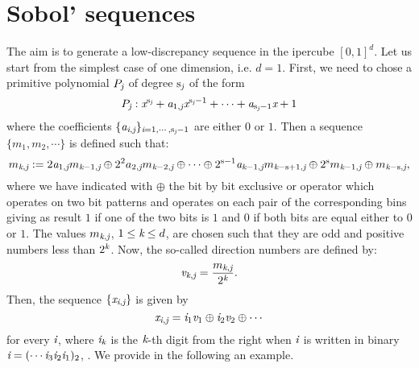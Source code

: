 \section{Sobol' sequences}
The aim is to generate a low-discrepancy sequence in the ipercube $[0,1]^{d}$. 
Let us start from the simplest case of one dimension, i.e. $d=1$. First, we need to chose a primitive polynomial $P_{\textit{j}}$ of degree $\textrm{s}_{\textit{j}}$ of the form
\begin{equation}
P_{\textit{j}}:\textit{x}^{\textrm{s}_{\textit{j}}}+\textit{a}_{1, \textit{j}}\textit{x}^{\textrm{s}_{\textit{j}}-1}+\cdots+\textit{a}_{\textrm{s}_{\textit{j}}-1}\textit{x}+1
\end{equation}
where the coefficients $\{\textit{a}_{\textit{i},\textit{j}}\}_{\textit{i}= 1, \cdots, \textrm{s}_{\textit{j}}-1}$ are either $0$ or $1$. 
Then a sequence $\{m_1,m_2,\cdots\}$ is defined such that:
\begin{equation}\label{eq:m}
m_{\textit{k}, \textit{j}} := 2\textit{a}_{1, \textit{j}}m_{\textit{k}-1, \textit{j}}\oplus 2^2a_{2, \textit{j}}m_{\textit{k}-2, \textit{j}}\oplus \cdots \oplus 2^{\textrm{s}-1}\textit{a}_{\textit{k}-1, \textit{j}}m_{\textit{k}-\textrm{s}+1, \textit{j}}\oplus 2^{\textrm{s}}m_{\textit{k}-1, \textit{j}}\oplus m_{\textit{k}-\textrm{s}, \textit{j}},
\end{equation}
where we have indicated with $\oplus$ the bit by bit exclusive or operator which operates on two bit patterns and operates on each pair of the corresponding bins giving as result $1$ if one of the two bits is $1$ and $0$ if both bits are equal either to $0$ or $1$. The values $m_{\textit{k}, \textit{j}}$, $1\leq\textit{k}\leq d$, are chosen such that they are odd and positive numbers less than $2^{\textit{k}}$. Now, the so-called direction numbers are defined by:
\begin{equation}\label{eq:dir_numb}
\textit{v}_{\textit{k}, \textit{j}}=\frac{m_{\textit{k}, \textit{j}}}{2^{\textit{k}}}.
\end{equation}
Then, the sequence $\{\textit{x}_{\textit{i}, \textit{j}}\}$ is given by
\begin{equation}
\textit{x}_{\textit{i}, \textit{j}} = \textit{i}_1\textit{v}_1\oplus \textit{i}_2\textit{v}_{2}\oplus \cdots
\end{equation}
for every $\textit{i}$, where $\textit{i}_{\textit{k}}$ is the $\textit{k}$-th digit from the right when $\textit{i}$ is written in binary $\textit{i} = (\cdots \textit{i}_3\textit{i}_2\textit{i}_1)_2$, \cite{joe2008notes}. We provide in the following an example. \\ \indent
